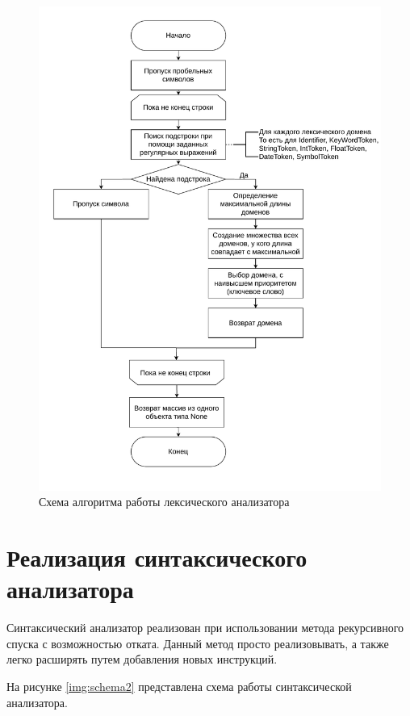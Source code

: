 \begin{figure}[h!]
	\begin{center}
		\includegraphics[scale=0.55]{./inc/img/schema1.pdf}
		\caption{Схема алгоритма работы лексического анализатора}
		\label{img:schema1}
	\end{center}
\end{figure}
\newpage


\section{Реализация синтаксического анализатора}

Синтаксический анализатор реализован при использовании метода рекурсивного спуска с возможностью отката. Данный метод просто реализовывать, а также легко расширять путем добавления новых инструкций.


На рисунке \ref{img:schema2} представлена схема работы синтаксической анализатора.

